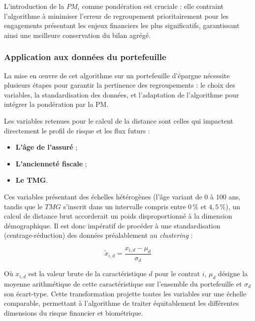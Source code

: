 L'introduction de la $PM_i$ comme pondération est cruciale : elle contraint l'algorithme à minimiser l'erreur de regroupement prioritairement pour les engagements présentant les enjeux financiers les plus significatifs, garantissant ainsi une meilleure conservation du bilan agrégé.

\subsubsection{Application aux données du portefeuille}
La mise en œuvre de cet algorithme sur un portefeuille d'épargne nécessite plusieurs étapes pour garantir la pertinence des regroupements : le choix des variables, la standardisation des données, et l'adaptation de l'algorithme pour intégrer la pondération par la PM.

Les variables retenues pour le calcul de la distance sont celles qui impactent directement le profil de risque et les flux futurs :
\begin{itemize}
    \item \textbf{L'âge de l'assuré} ;
    \item \textbf{L'ancienneté fiscale} ;
    \item \textbf{Le TMG}.
\end{itemize}

Ces variables présentant des échelles hétérogènes (l'âge variant de $0$ à $100$ ans, tandis que le $TMG$ s'inscrit dans un intervalle compris entre $0\,\%$ et $4{,}5\,\%$), un calcul de distance brut accorderait un poids disproportionné à la dimension démographique. Il est donc impératif de procéder à une standardisation (centrage-réduction) des données préalablement au \textit{clustering} :

\begin{equation}
    \tilde{x}_{i, d} = \frac{x_{i, d} - \mu_d}{\sigma_d} 
\end{equation}

Où $x_{i, d}$ est la valeur brute de la caractéristique $d$ pour le contrat $i$, $\mu_d$ désigne la moyenne arithmétique de cette caractéristique sur l'ensemble du portefeuille et $\sigma_d$ son écart-type. Cette transformation projette toutes les variables sur une échelle comparable, permettant à l'algorithme de traiter équitablement les différentes dimensions du risque financier et biométrique.

